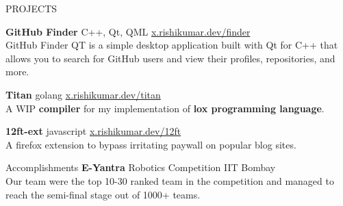\documentclass{resume} %
\begin{document}
	\begin{rSection}{PROJECTS}
		\vspace{-1.25em}
		\item \textbf{GitHub Finder} {C++, Qt, QML} \hfill {\href{x.rishikumar.dev/finder}{x.rishikumar.dev/finder}}\\
			{GitHub Finder QT is a simple desktop application built with Qt for C++ that allows you to search for GitHub users and view their profiles, repositories, and more.} 
		\item \textbf{Titan} {golang} \hfill {\href{x.rishikumar.dev/titan}{x.rishikumar.dev/titan}}\\
			{A WIP \textbf{compiler} for my implementation of \textbf{lox programming language}.}
		\item \textbf{12ft-ext} {javascript} \hfill {\href{x.rishikumar.dev/12ft}{x.rishikumar.dev/12ft}}\\
		{A firefox extension to bypass irritating paywall on popular blog sites.}
	\end{rSection} 

	
	\begin{rSection}{Accomplishments} 
		\textbf{E-Yantra} {Robotics Competition} \hfill IIT Bombay\\
		{Our team were the top 10-30 ranked team in the competition and managed to reach the semi-final stage out of 1000+ teams.} 	
	\end{rSection}
\end{document}
